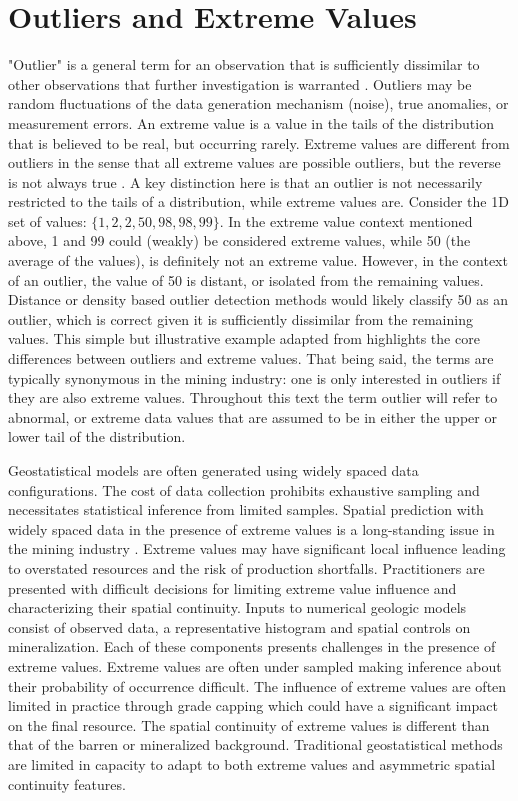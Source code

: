 \FloatBarrier
\section{Outliers and Extreme Values}
\label{sec:02extreme}

"Outlier" is a general term for an observation that is sufficiently dissimilar to other observations that further investigation is warranted \citep{barnett1984outliers}. Outliers may be random fluctuations of the data generation mechanism (noise), true anomalies, or measurement errors. An extreme value is a value in the tails of the distribution that is believed to be real, but occurring rarely. Extreme values are different from outliers in the sense that all extreme values are possible outliers, but the reverse is not always true \citep{aggarwal2016outlier}. A key distinction here is that an outlier is not necessarily restricted to the tails of a distribution, while extreme values are. Consider the \gls{1D} set of values: $\{1,2,2,50,98,98,99\}$. In the extreme value context mentioned above, 1 and 99 could (weakly) be considered extreme values, while 50 (the average of the values), is definitely not an extreme value. However, in the context of an outlier, the value of 50 is distant, or isolated from the remaining values. Distance or density based outlier detection methods would likely classify 50 as an outlier, which is correct given it is sufficiently dissimilar from the remaining values. This simple but illustrative example adapted from \cite{aggarwal2016outlier} highlights the core differences between outliers and extreme values. That being said, the terms are typically synonymous in the mining industry: one is only interested in outliers if they are also extreme values. Throughout this text the term outlier will refer to abnormal, or extreme data values that are assumed to be in either the upper or lower tail of the distribution.

Geostatistical models are often generated using widely spaced data configurations. The cost of data collection prohibits exhaustive sampling and necessitates statistical inference from limited samples. Spatial prediction with widely spaced data in the presence of extreme values is a long-standing issue in the mining industry \citep{leuangthong2015dealing}. Extreme values may have significant local influence leading to overstated resources and the risk of production shortfalls. Practitioners are presented with difficult decisions for limiting extreme value influence and characterizing their spatial continuity. Inputs to numerical geologic models consist of observed data, a representative histogram and spatial controls on mineralization. Each of these components presents challenges in the presence of extreme values. Extreme values are often under sampled making inference about their probability of occurrence difficult. The influence of extreme values are often limited in practice through grade capping which could have a significant impact on the final resource. The spatial continuity of extreme values is different than that of the barren or mineralized background. Traditional geostatistical methods are limited in capacity to adapt to both extreme values and asymmetric spatial continuity features.


